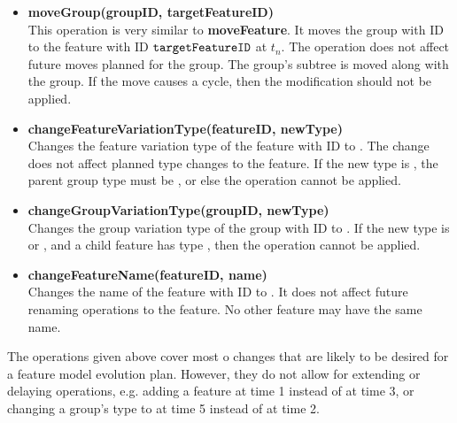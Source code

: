 \begin{itemize}
  \item \textbf{moveGroup(groupID, targetFeatureID)} \\
    This operation is very similar to \textbf{moveFeature}. It moves the group with ID  to the feature with ID $\texttt{targetFeatureID}$ at $t_n$. The operation does not affect future moves planned for the group. The group's subtree is moved along with the group. If the move causes a cycle, then the modification should not be applied.
  \item \textbf{changeFeatureVariationType(featureID, newType)} \\
    Changes the feature variation type of the feature with ID  to . The change does not affect planned type changes to the feature. If the new type is \mandatory{}, the parent group type must be \andtype{}, or else the operation cannot be applied.
  \item \textbf{changeGroupVariationType(groupID, newType)}\\
    Changes the group variation type of the group with ID  to . If the new type is \ortype{} or \xortype{}, and a child feature has type \optional{}, then the operation cannot be applied. 
  \item \textbf{changeFeatureName(featureID, name)}\\
    Changes the name of the feature with ID  to . It does not affect future renaming operations to the feature. No other feature may have the same name.
\end{itemize}

The operations given above cover most o changes that are likely to be desired for a feature model evolution plan. However, they do not allow for extending or delaying operations, e.g. adding a feature at time 1 instead of at time 3, or changing a group's type to \optional{} at time 5 instead of at time 2.
